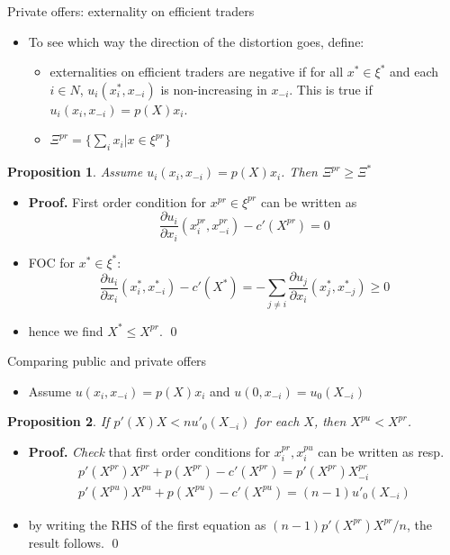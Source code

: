 \documentclass[11pt,english]{beamer}
\newcommand{\dif}{\partial}
\newtheorem{proposition}{Proposition}
\begin{document}
\begin{frame}[allowframebreaks]{Private offers: externality on
    efficient traders}
\begin{itemize}
\begin{equation*}
    \end{equation*}
    and hence $x^{pr} \in \xi^*$. \qed
  \item To see which way the direction of the distortion goes, define:
    \begin{itemize}
    \item externalities on efficient traders are negative if for all
      $x^* \in \xi^*$ and each $i \in N$, $u_i(x_i^*,x_{-i})$ is
      non-increasing in $x_{-i}$. This is true if $u_i(x_i,x_{-i})=p(X)x_i$.
    \item $\Xi^{pr} = \{ \sum_i x_i | x \in \xi^{pr} \}$
    \end{itemize}
  \end{itemize}
  \begin{proposition}
    Assume $u_i(x_i,x_{-i})=p(X)x_i$. Then $\Xi^{pr} \geq \Xi^*$
  \end{proposition}
  \begin{itemize}
  \item \textbf{Proof.} First order condition for $x^{pr} \in
    \xi^{pr}$ can be written as
    \begin{equation*}
      \frac{\dif u_i}{\dif x_i}(x_i^{pr},x_{-i}^{pr}) - c'(X^{pr}) =0
    \end{equation*}
  \item FOC for $x^* \in \xi^*$:
    \begin{equation*}
      \frac{\dif u_i}{\dif x_i}(x_i^{*},x_{-i}^{*}) - c'(X^{*}) =
      -\sum_{j \neq i} \frac{\dif u_j}{\dif x_i}(x_j^{*},x_{-j}^{*}) \geq 0
    \end{equation*}
  \item hence we find $X^* \leq X^{pr}$. \qed
  \end{itemize}
\end{frame}

\begin{frame}[allowframebreaks]{Comparing public and private offers}
  \begin{itemize}
  \item Assume $u(x_i,x_{-i})=p(X)x_i$ and $u(0,x_{-i})=u_0(X_{-i})$
  \end{itemize}
  \begin{proposition}
    If $p'(X)X< n u'_0(X_{-i})$ for each $X$, then $X^{pu} < X^{pr}$.
  \end{proposition}
  \begin{itemize}
  \item \textbf{Proof.} \emph{Check} that first order conditions for
    $x_i^{pr},x_i^{pu}$ can be written as resp.
    \begin{eqnarray*}
      p'(X^{pr})X^{pr}+p(X^{pr})-c'(X^{pr}) = p'(X^{pr})X^{pr}_{-i} \\
      p'(X^{pu})X^{pu}+p(X^{pu})-c'(X^{pu}) = (n-1) u'_0(X_{-i})
    \end{eqnarray*}
  \item by writing the RHS of the first equation as
    $(n-1)p'(X^{pr})X^{pr}/n$, the result follows. \qed
  \end{itemize}
\end{frame}
\end{document}

